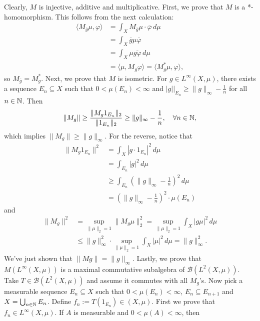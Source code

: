 \begin{myproof}
  Clearly, $M$ is injective, additive and multiplicative.
  First, we prove that $M$ is a *-homomorphism. This follows from the next calculation:
  \begin{align*}
    \langle M_{\overline{g}} \mu, \varphi \rangle &= \int_X M_{\overline{g}} \mu \cdot \overline{\varphi}\, d\mu\\
    &= \int_X \overline{g}\mu \overline{\varphi}\\
    &= \int_X \mu \overline{g \varphi}\, d\mu\\
    &= \langle \mu, M_g\varphi\rangle = \langle M_g ^* \mu, \varphi \rangle,
  \end{align*}
  so $M_{\overline{g}} = M_g ^*$. Next, we prove that $M$ is isometric.
  For $g \in L^\infty (X, \mu)$, there exists a sequence $E_n \subseteq X$ such that $0 < \mu(E_n) < \infty$
  and $|g|\big|_{E_n} \geq \|g\|_{\infty} -\frac{1}{n}$ for all $n \in \mathbb {N}$.
  Then 
  $$\| M_g \| \geq \frac{\| M_g 1_{E_n}\|_2}{\| 1_{E_n}\|_2} \geq \|g\|_{\infty} - \frac{1}{n},\quad \forall n \in \mathbb {N},$$
  which implies $\|M_g\| \geq \|g\|_{\infty}$.
  For the reverse, notice that 
  \begin{align*}
    \| M_g 1_{E_n} \|^2 &= \int_X |g \cdot 1_{E_n}|^2\, d\mu\\
    &= \int_{E_n} |g|^2\, d\mu\\
    &\geq \int_{E_n} (\|g\|_{\infty} - \frac{1}{n})^2\, d\mu \\
    &= (\|g\|_\infty -\frac{1}{n})^2 \cdot \mu(E_n)
  \end{align*}
  and 
  \begin{align*}
    \|M_g\|^2 &= \sup_{\| \mu\|_2 = 1} \| M_g \mu\|^2 _2 = \sup_{\| \mu\|_2 = 1} \int_X |g\mu|^2\, d\mu\\
    &\leq \|g\|_{\infty} ^2 \cdot \sup_{\| \mu\|_2 = 1} \int_X |\mu|^2\, d\mu = \|g\|_{\infty} ^2.
  \end{align*}
  We've just shown that $\|Mg\| = \|g\|_{\infty}$.
  Lastly, we prove that $M(L^\infty (X, \mu))$ is a maximal commutative subalgebra of $\mathcal{B}(L^2 (X, \mu))$.
  Take $T \in \mathcal{B}(L^2 (X, \mu))$ and assume it commutes with all $M_g$'s.
  Now pick a measurable sequence $E_n \subseteq X$ such that $0 < \mu(E_n) < \infty$, $E_n \subseteq E_{n + 1}$ and $X = \bigcup_{n \in \mathbb {N}} E_n$.
  Define $f_n := T(1_{E_n}) \in (X, \mu)$. First we prove that $f_n \in L^\infty (X, \mu)$. If $A$ is measurable and $0 < \mu(A) < \infty$, then 
  \begin{align*}

\end{align*}
\end{myproof}
